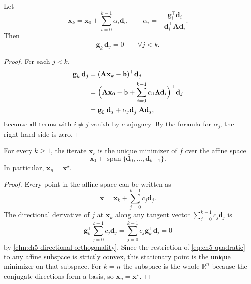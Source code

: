 \begin{claim}
\label{clm:ch5-directional-orthogonality}
Let
\[
  \mathbf{x}_k=\mathbf{x}_0+\sum_{i=0}^{k-1}\alpha_i \mathbf{d}_i,
  \qquad
  \alpha_i=-\frac{\mathbf{g}_i^{\top}\mathbf{d}_i}
  {\mathbf{d}_i^{\top}\mathbf{A}\mathbf{d}_i}.
\]
Then
\[
  \mathbf{g}_k^{\top}\mathbf{d}_j=0
  \qquad \forall j<k.
\]
\end{claim}
\begin{proof}
For each $j<k$,
\begin{align*}
  \mathbf{g}_k^{\top}\mathbf{d}_j
  &= (\mathbf{A}\mathbf{x}_k-\mathbf{b})^{\top}\mathbf{d}_j \\
  &= \Bigl(\mathbf{A}\mathbf{x}_0-\mathbf{b}
  +\sum_{i=0}^{k-1}\alpha_i \mathbf{A}\mathbf{d}_i\Bigr)^{\top}\mathbf{d}_j \\
  &= \mathbf{g}_0^{\top}\mathbf{d}_j
  +\alpha_j \mathbf{d}_j^{\top}\mathbf{A}\mathbf{d}_j,
\end{align*}
because all terms with $i\neq j$ vanish by conjugacy. By the formula for
$\alpha_j$, the right-hand side is zero.
\end{proof}

\begin{theorem}
\label{thm:ch5-conjugate-directions}
For every $k\ge 1$, the iterate $\mathbf{x}_k$ is the unique minimizer of $f$
over the affine space
\[
  \mathbf{x}_0+\operatorname{span}\{\mathbf{d}_0,\ldots,\mathbf{d}_{k-1}\}.
\]
In particular, $\mathbf{x}_n=\mathbf{x}^\star$.
\end{theorem}
\begin{proof}
Every point in the affine space can be written as
\[
  \mathbf{x}=\mathbf{x}_k+\sum_{j=0}^{k-1} c_j \mathbf{d}_j.
\]
The directional derivative of $f$ at $\mathbf{x}_k$ along any tangent vector
$\sum_{j=0}^{k-1} c_j \mathbf{d}_j$ is
\[
  \mathbf{g}_k^{\top}\sum_{j=0}^{k-1} c_j \mathbf{d}_j
  =\sum_{j=0}^{k-1} c_j \mathbf{g}_k^{\top}\mathbf{d}_j
  =0
\]
by \cref{clm:ch5-directional-orthogonality}. Since the restriction of
\eqref{eq:ch5-quadratic} to any affine subspace is strictly convex, this
stationary point is the unique minimizer on that subspace. For $k=n$ the
subspace is the whole $\mathbb{R}^n$ because the conjugate directions form a
basis, so $\mathbf{x}_n=\mathbf{x}^\star$.
\end{proof}

